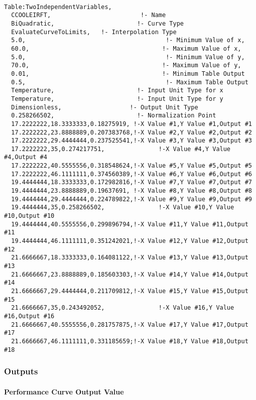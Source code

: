 \begin{lstlisting}

Table:TwoIndependentVariables,
  CCOOLEIRFT,                         !- Name
  BiQuadratic,                       !- Curve Type
  EvaluateCurveToLimits,   !- Interpolation Type
  5.0,                                       !- Minimum Value of x,
  60.0,                                     !- Maximum Value of x,
  5.0,                                       !- Minimum Value of y,
  70.0,                                     !- Maximum Value of y,
  0.01,                                     !- Minimum Table Output
  0.5,                                       !- Maximum Table Output
  Temperature,                       !- Input Unit Type for x
  Temperature,                       !- Input Unit Type for y
  Dimensionless,                   !- Output Unit Type
  0.258266502,                       !- Normalization Point
  17.2222222,18.3333333,0.18275919, !-X Value #1,Y Value #1,Output #1
  17.2222222,23.8888889,0.207383768,!-X Value #2,Y Value #2,Output #2
  17.2222222,29.4444444,0.237525541,!-X Value #3,Y Value #3,Output #3
  17.2222222,35,0.274217751,               !-X Value #4,Y Value #4,Output #4
  17.2222222,40.5555556,0.318548624,!-X Value #5,Y Value #5,Output #5
  17.2222222,46.1111111,0.374560389,!-X Value #6,Y Value #6,Output #6
  19.4444444,18.3333333,0.172982816,!-X Value #7,Y Value #7,Output #7
  19.4444444,23.8888889,0.19637691, !-X Value #8,Y Value #8,Output #8
  19.4444444,29.4444444,0.224789822,!-X Value #9,Y Value #9,Output #9
  19.4444444,35,0.258266502,               !-X Value #10,Y Value #10,Output #10
  19.4444444,40.5555556,0.299896794,!-X Value #11,Y Value #11,Output #11
  19.4444444,46.1111111,0.351242021,!-X Value #12,Y Value #12,Output #12
  21.6666667,18.3333333,0.164081122,!-X Value #13,Y Value #13,Output #13
  21.6666667,23.8888889,0.185603303,!-X Value #14,Y Value #14,Output #14
  21.6666667,29.4444444,0.211709812,!-X Value #15,Y Value #15,Output #15
  21.6666667,35,0.243492052,               !-X Value #16,Y Value #16,Output #16
  21.6666667,40.5555556,0.281757875,!-X Value #17,Y Value #17,Output #17
  21.6666667,46.1111111,0.331185659;!-X Value #18,Y Value #18,Output #18
\end{lstlisting}

\subsubsection{Outputs}\label{outputs-1-017}

\paragraph{\texorpdfstring{Performance Curve Output Value \protect\hyperlink{section-1}{}}{Performance Curve Output Value }}\label{performance-curve-output-value-1}

